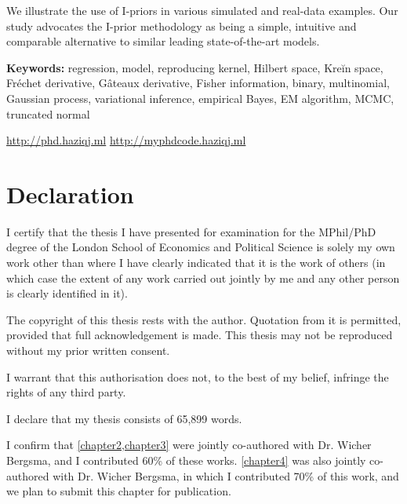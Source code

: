 \documentclass[11pt,twoside,openright,showframe]{report}
\begin{document}
We illustrate the use of I-priors in various simulated and real-data examples. 
Our study advocates the I-prior methodology as being a simple, intuitive and comparable alternative to similar leading state-of-the-art models. 


\vspace{1em}
{\noindent\textbf{Keywords:} 
	regression, model, reproducing kernel, Hilbert space, Kreĭn space, Fréchet derivative, Gâteaux derivative, Fisher information, binary, multinomial, Gaussian process, variational inference, empirical Bayes, EM algorithm, MCMC, truncated normal
}

\vfill

\begin{center}
  \url{http://phd.haziqj.ml} \textbullet{} \url{http://myphdcode.haziqj.ml}
\end{center}

\chapter*{Declaration} 

I certify that the thesis I have presented for examination for the MPhil/PhD degree of the London School of Economics and Political Science is solely my own work other than where I have clearly indicated that it is the work of others (in which case the extent of any work carried out jointly by me and any other person is clearly identified in it).

The copyright of this thesis rests with the author. Quotation from it is permitted, provided that full acknowledgement is made. 
This thesis may not be reproduced without my prior written consent.

I warrant that this authorisation does not, to the best of my belief, infringe the rights of any third party.

I declare that my thesis consists of 65,899 words.

I confirm that \cref{chapter2,chapter3} were jointly co-authored with Dr. Wicher Bergsma, and I contributed 60\% of these works.
\cref{chapter4} was also jointly co-authored with Dr. Wicher Bergsma, in which I contributed 70\% of this work, and we plan to submit this chapter for publication.
\end{document}
